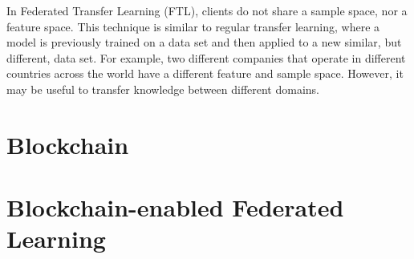 In Federated Transfer Learning (FTL), clients do not share a sample space, nor a feature space. This technique is similar to regular transfer learning, where a model is previously trained on a data set and then applied to a new similar, but different, data set. For example, two different companies that operate in different countries across the world have a different feature and sample space. However, it may be useful to transfer knowledge between different domains.

\section{Blockchain}
\label{preliminaries:blockchain}



\cite{nakamoto2009bitcoin}


\section{Blockchain-enabled Federated Learning}

